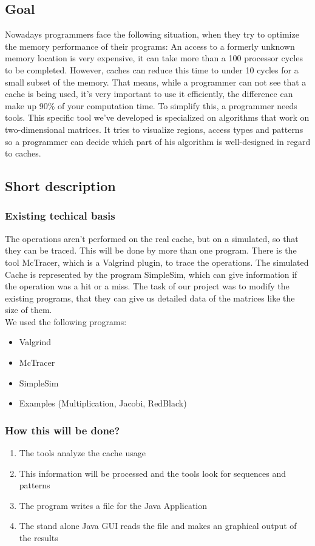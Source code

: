\subsection{Goal}
Nowadays programmers face the following situation, when they try to optimize the memory performance of their programs: An access to a formerly unknown memory location is very expensive, it can take more than a 100 processor cycles to be completed. However, caches can reduce this time to under 10 cycles for a small subset of the memory. That means, while a programmer can not see that a cache is being used, it's very important to use it efficiently, the difference can make up 90\% of your computation time.\newline
To simplify this, a programmer needs tools. This specific tool we've developed is specialized on algorithms that work on two-dimensional matrices. It tries to visualize regions, access types and patterns so a programmer can decide which part of his algorithm is well-designed in regard to caches.

\subsection{Short description}
\subsubsection{Existing techical basis}
The operations aren't performed on the real cache, but on a simulated, so that they can be traced. This will be done by more than one program. There is the tool McTracer, which is a Valgrind plugin, to trace the operations. The simulated Cache is represented by the program SimpleSim, which can give information if the operation was a hit or a miss. The task of our project was to modify the existing programs, that they can give us detailed data of the matrices like the size of them.
\\

We used the following programs:
\begin{itemize}
\item Valgrind
\item McTracer
\item SimpleSim
\item Examples (Multiplication, Jacobi, RedBlack)
\end{itemize}

\subsubsection{How this will be done?}
\begin{enumerate}
\item The tools analyze the cache usage
\item This information will be processed and the tools look for sequences and patterns
\item The program writes a file for the Java Application
\item The stand alone Java GUI reads the file and makes an graphical output of the results
\end{enumerate}

